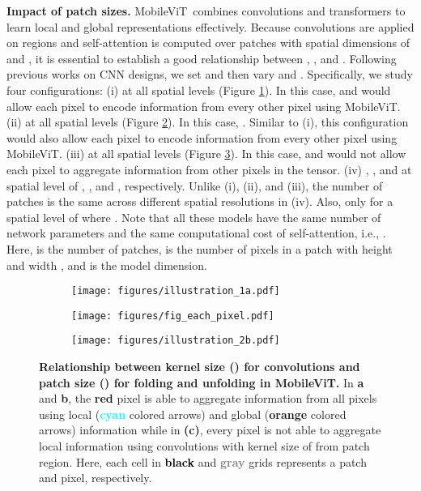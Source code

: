 \documentclass[preprint]{article} \usepackage{iclr2022_conference,times}
\newcommand{\arch}{MobileViT}
\begin{document}
\textbf{Impact of patch sizes.} \arch~combines convolutions and transformers to learn local and global representations effectively. Because convolutions are applied on  regions and self-attention is computed over patches with spatial dimensions of  and , it is essential to establish a good relationship between , , and . Following previous works on CNN designs, we set  and then vary  and . Specifically, we study four configurations: (i)  at all spatial levels (Figure \ref{fig:ablation_rep_learning_a}). In this case,  and would allow each pixel to encode information from every other pixel using \arch. (ii)  at all spatial levels (Figure \ref{fig:ablation_rep_learning_b}). In this case, . Similar to (i), this configuration would also allow each pixel to encode information from every other pixel using \arch. (iii)  at all spatial levels (Figure \ref{fig:ablation_rep_learning_c}). In this case,  and would not allow each pixel to aggregate information from other pixels in the tensor. (iv) , , and  at spatial level of , , and , respectively. Unlike (i), (ii), and (iii), the number of patches  is the same across different spatial resolutions in (iv). Also,  only for a spatial level of  where . Note that all these models have the same number of network parameters and the same computational cost of self-attention, i.e., . Here,  is the number of patches,  is the number of pixels in a patch with height  and width , and  is the model dimension. 

\begin{figure}[t!]
    \centering
    \begin{subfigure}[b]{0.3\columnwidth}
        \centering
        \texttt{[image: figures/illustration\_1a.pdf]}
        \caption{}
        \label{fig:ablation_rep_learning_a}
    \end{subfigure}
    \hfill
    \begin{subfigure}[b]{0.3\columnwidth}
        \centering
        \texttt{[image: figures/fig\_each\_pixel.pdf]}
        \caption{}
        \label{fig:ablation_rep_learning_b}
    \end{subfigure}
    \hfill
    \begin{subfigure}[b]{0.3\columnwidth}
        \centering
        \texttt{[image: figures/illustration\_2b.pdf]}
        \caption{}
        \label{fig:ablation_rep_learning_c}
    \end{subfigure}
    \caption{\textbf{Relationship between kernel size () for convolutions and patch size () for folding and unfolding in \arch.} In \textbf{a} and \textbf{b}, the \textcolor{centerPix}{\bfseries red} pixel is able to aggregate information from all pixels using local (\textcolor{cyan}{\bfseries cyan} colored arrows) and global (\textcolor{gArrow}{\bfseries orange} colored arrows) information while in \textbf{(c)}, every pixel is not able to aggregate local information using convolutions with kernel size of   from  patch region. Here, each cell in \textcolor{black}{\bf black} and \textcolor{gray}{\bf gray} grids represents a patch and pixel, respectively.}
    \label{fig:ablation_rep_learning}
\end{figure}
\end{document}

